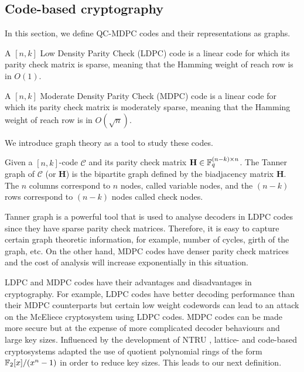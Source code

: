 \subsection{Code-based cryptography}

In this section, we define QC-MDPC codes and their representations as graphs. 

\begin{defn}
A $[n,k]$ Low Density Parity Check (LDPC) code is a linear code for which its parity check matrix is sparse, meaning that the Hamming weight of reach row is in $O(1)$.

A $[n,k]$ Moderate Density Parity Check (MDPC) code is a linear code for which its parity check matrix is moderately sparse, meaning that the Hamming weight of reach row is in $O(\sqrt{n})$.
\end{defn}

We introduce graph theory as a tool to study these codes.

\begin{defn}
Given a $[n,k]$-code $\mathcal{C}$ and its parity check matrix $\mathbf{H} \in \mathbb{F}_q^{(n-k) \times n}$. The Tanner graph of $\mathcal{C}$ (or $\mathbf{H}$) is the bipartite graph defined by the biadjacency matrix $\mathbf{H}$. The $n$ columns correspond to $n$ nodes, called variable nodes, and the $(n-k)$ rows correspond to $(n-k)$ nodes called check nodes.
\end{defn}

Tanner graph is a powerful tool that is used to analyse decoders in LDPC codes since they have sparse parity check matrices. Therefore, it is easy to capture certain graph theoretic information, for example, number of cycles, girth of the graph, etc. On the other hand, MDPC codes have denser parity check matrices and the cost of analysis will increase exponentially in this situation.

LDPC and MDPC codes have their advantages and disadvantages in cryptography. For example, LDPC codes have better decoding performance than their MDPC counterparts but certain low weight codewords can lead to an attack on the McEliece cryptosystem using LDPC codes. MDPC codes can be made more secure but at the expense of more complicated decoder behaviours and large key sizes. Influenced by the development of NTRU \cite{ntru}, lattice- and code-based cryptosystems adapted the use of quotient polynomial rings of the form $\mathbb{F}_2[x]/(x^n -1)$ in order to reduce key sizes. This leads to our next definition.


